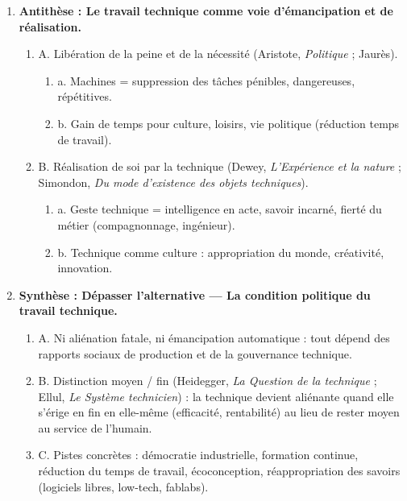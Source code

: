 \documentclass[11pt]{article}
\newcommand{\cle}[1]{{\popxbold\color{popdark}#1}}
\begin{document}
\begin{exemplebox}
\begin{enumerate}
\begin{enumerate}
\begin{enumerate}
                \end{enumerate}
        \end{enumerate}
    \item \textbf{Antith\`ese : Le travail technique comme voie d'\'emancipation et de r\'ealisation.}
        \begin{enumerate}
            \item A. Lib\'eration de la peine et de la n\'ecessit\'e (Aristote, \emph{Politique} ; Jaur\`es).
                \begin{enumerate}
                    \item a. Machines = suppression des t\^aches p\'enibles, dangereuses, r\'ep\'etitives.
                    \item b. Gain de temps pour culture, loisirs, vie politique (r\'eduction temps de travail).
                \end{enumerate}
            \item B. R\'ealisation de soi par la technique (Dewey, \emph{L'Exp\'erience et la nature} ; Simondon, \emph{Du mode d'existence des objets techniques}).
                \begin{enumerate}
                    \item a. Geste technique = intelligence en acte, savoir incarn\'e, fiert\'e du m\'etier (compagnonnage, ing\'enieur).
                    \item b. Technique comme \guillemotleft culture \guillemotright : appropriation du monde, cr\'eativit\'e, innovation.
                \end{enumerate}
        \end{enumerate}
    \item \textbf{Synth\`ese : D\'epasser l'alternative --- La condition politique du travail technique.}
        \begin{enumerate}
            \item A. Ni ali\'enation fatale, ni \'emancipation automatique : tout d\'epend des \cle{rapports sociaux de production} et de la \cle{gouvernance technique}.
            \item B. Distinction \cle{moyen / fin} (Heidegger, \emph{La Question de la technique} ; Ellul, \emph{Le Syst\`eme technicien}) : la technique devient ali\'enante quand elle s'\'erige en fin en elle-m\^eme (efficacit\'e, rentabilit\'e) au lieu de rester moyen au service de l'humain.
            \item C. Pistes concr\`etes : d\'emocratie industrielle, formation continue, r\'eduction du temps de travail, \'ecoconception, r\'eappropriation des savoirs (logiciels libres, low-tech, fablabs).

\end{enumerate}
\end{enumerate}
\end{exemplebox}
\end{document}
